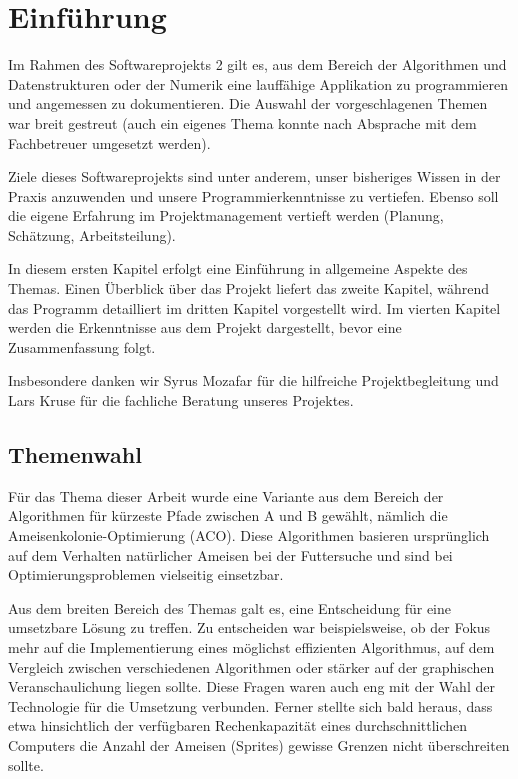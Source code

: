 

\chapter{Einführung}

Im Rahmen des Softwareprojekts 2 gilt es, aus dem Bereich der Algorithmen und Datenstrukturen oder der Numerik eine lauffähige Applikation zu programmieren und angemessen zu dokumentieren. Die Auswahl der vorgeschlagenen Themen war breit gestreut (auch ein eigenes Thema konnte nach Absprache mit dem Fachbetreuer umgesetzt werden).

Ziele dieses Softwareprojekts sind unter anderem, unser bisheriges Wissen in der Praxis anzuwenden und unsere Programmierkenntnisse zu vertiefen. Ebenso soll die eigene Erfahrung im   Projektmanagement vertieft werden (Planung, Schätzung, Arbeitsteilung).

In diesem ersten Kapitel erfolgt eine Einführung in allgemeine Aspekte des Themas. Einen Überblick über das Projekt liefert das zweite Kapitel, während das Programm detailliert im dritten Kapitel vorgestellt wird. Im vierten Kapitel werden die Erkenntnisse aus dem Projekt dargestellt, bevor eine Zusammenfassung folgt. 

\noindent
Insbesondere danken wir Syrus Mozafar für die hilfreiche Projektbegleitung und Lars Kruse für die fachliche Beratung unseres Projektes.


\section{Themenwahl}

Für das Thema dieser Arbeit wurde eine Variante aus dem Bereich der Algorithmen für kürzeste Pfade zwischen A und B gewählt, nämlich die Ameisenkolonie-Optimierung (ACO). Diese Algorithmen basieren ursprünglich auf dem Verhalten natürlicher Ameisen bei der Futtersuche und sind bei Optimierungsproblemen vielseitig einsetzbar.

Aus dem breiten Bereich des Themas galt es, eine Entscheidung für eine umsetzbare Lösung zu treffen. Zu entscheiden war beispielsweise, ob der Fokus mehr auf die Implementierung eines möglichst effizienten Algorithmus, auf dem Vergleich zwischen verschiedenen Algorithmen oder stärker auf der graphischen Veranschaulichung liegen sollte. Diese Fragen waren auch eng mit der Wahl der Technologie für die Umsetzung verbunden. Ferner stellte sich bald heraus, dass etwa hinsichtlich der verfügbaren Rechenkapazität eines durchschnittlichen Computers die Anzahl der Ameisen (Sprites) gewisse Grenzen nicht überschreiten sollte.

